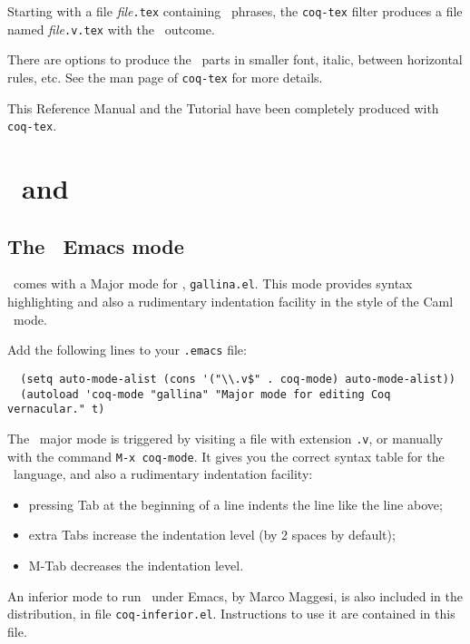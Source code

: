Starting with a file {\em file}{\tt.tex} containing \Coq\ phrases,
the {\tt coq-tex} filter produces a file named {\em file}{\tt.v.tex} with
the \Coq\ outcome.

There are options to produce the \Coq\ parts in smaller font, italic,
between horizontal rules, etc.
See the man page of {\tt coq-tex} for more details.

\medskip{} This Reference Manual and the Tutorial
have been completely produced with {\tt coq-tex}.


\section[\Coq\ and \emacs]{\Coq\ and \emacs\label{Emacs}}

\subsection{The \Coq\ Emacs mode}

\Coq\ comes with a Major mode for \emacs, {\tt gallina.el}. This mode provides
syntax highlighting
and also a rudimentary indentation facility
in the style of the Caml \emacs\ mode.

Add the following lines to your \verb!.emacs! file:

\begin{verbatim}
  (setq auto-mode-alist (cons '("\\.v$" . coq-mode) auto-mode-alist))
  (autoload 'coq-mode "gallina" "Major mode for editing Coq vernacular." t)
\end{verbatim}

The \Coq\ major mode is triggered by visiting a file with extension {\tt .v},
or manually with the command \verb!M-x coq-mode!.
It gives you the correct syntax table for
the \Coq\ language, and also a rudimentary indentation facility:
\begin{itemize}
  \item pressing {\sc Tab} at the beginning of a line indents the line like
    the line above;

  \item extra {\sc Tab}s increase the indentation level
    (by 2 spaces by default);

  \item M-{\sc Tab} decreases the indentation level.
\end{itemize}

An inferior mode to run \Coq\ under Emacs, by Marco Maggesi, is also
included in the distribution, in file \texttt{coq-inferior.el}.
Instructions to use it are contained in this file.

